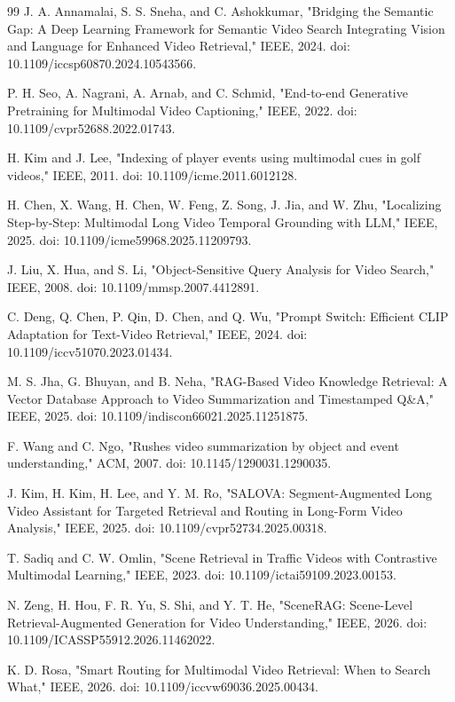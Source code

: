 \documentclass[conference]{IEEEtran}
\begin{document}
\begin{thebibliography}{99}
J. A. Annamalai, S. S. Sneha, and C. Ashokkumar, "Bridging the Semantic Gap: A Deep Learning Framework for Semantic Video Search Integrating Vision and Language for Enhanced Video Retrieval," IEEE, 2024. doi: 10.1109/iccsp60870.2024.10543566.

P. H. Seo, A. Nagrani, A. Arnab, and C. Schmid, "End-to-end Generative Pretraining for Multimodal Video Captioning," IEEE, 2022. doi: 10.1109/cvpr52688.2022.01743.

H. Kim and J. Lee, "Indexing of player events using multimodal cues in golf videos," IEEE, 2011. doi: 10.1109/icme.2011.6012128.

H. Chen, X. Wang, H. Chen, W. Feng, Z. Song, J. Jia, and W. Zhu, "Localizing Step-by-Step: Multimodal Long Video Temporal Grounding with LLM," IEEE, 2025. doi: 10.1109/icme59968.2025.11209793.

J. Liu, X. Hua, and S. Li, "Object-Sensitive Query Analysis for Video Search," IEEE, 2008. doi: 10.1109/mmsp.2007.4412891.

C. Deng, Q. Chen, P. Qin, D. Chen, and Q. Wu, "Prompt Switch: Efficient CLIP Adaptation for Text-Video Retrieval," IEEE, 2024. doi: 10.1109/iccv51070.2023.01434.

M. S. Jha, G. Bhuyan, and B. Neha, "RAG-Based Video Knowledge Retrieval: A Vector Database Approach to Video Summarization and Timestamped Q\&A," IEEE, 2025. doi: 10.1109/indiscon66021.2025.11251875.

F. Wang and C. Ngo, "Rushes video summarization by object and event understanding," ACM, 2007. doi: 10.1145/1290031.1290035.

J. Kim, H. Kim, H. Lee, and Y. M. Ro, "SALOVA: Segment-Augmented Long Video Assistant for Targeted Retrieval and Routing in Long-Form Video Analysis," IEEE, 2025. doi: 10.1109/cvpr52734.2025.00318.

T. Sadiq and C. W. Omlin, "Scene Retrieval in Traffic Videos with Contrastive Multimodal Learning," IEEE, 2023. doi: 10.1109/ictai59109.2023.00153.

N. Zeng, H. Hou, F. R. Yu, S. Shi, and Y. T. He, "SceneRAG: Scene-Level Retrieval-Augmented Generation for Video Understanding," IEEE, 2026. doi: 10.1109/ICASSP55912.2026.11462022.

K. D. Rosa, "Smart Routing for Multimodal Video Retrieval: When to Search What," IEEE, 2026. doi: 10.1109/iccvw69036.2025.00434.


\end{thebibliography}
\end{document}
